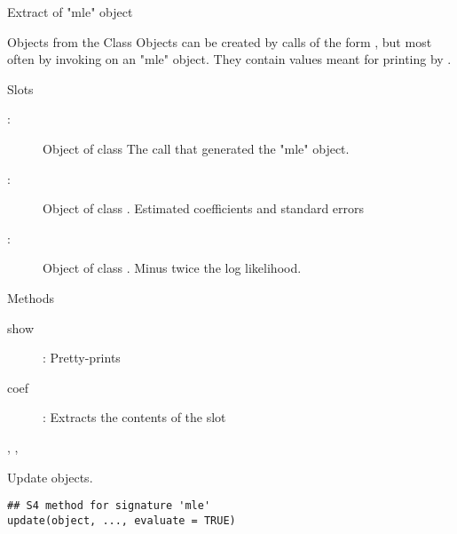 %
\begin{Description}\relax
Extract of "mle" object
\end{Description}
%
\begin{Section}{Objects from the Class}
Objects can be created by calls of the form , but most often by invoking  on an "mle" object.
They contain values meant for printing by .
\end{Section}
%
\begin{Section}{Slots}
\begin{description}

\item[:] Object of class  The call that
generated the "mle" object.
\item[:] Object of class . Estimated
coefficients and standard errors 
\item[:] Object of class . Minus twice
the log likelihood.

\end{description}

\end{Section}
%
\begin{Section}{Methods}
\begin{description}

\item[show] : Pretty-prints
\item[coef] : Extracts the
contents of the  slot

\end{description}

\end{Section}
%
\begin{SeeAlso}\relax
{}, ,  
\end{SeeAlso}
%
\begin{Description}\relax
Update  objects.
\end{Description}
%
\begin{Usage}
\begin{verbatim}
## S4 method for signature 'mle'
update(object, ..., evaluate = TRUE)
\end{verbatim}
\end{Usage}
